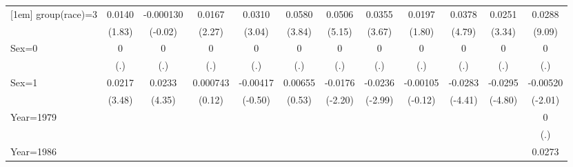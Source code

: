 \begin{table}[htbp]
\begin{tabular}{l*{11}{c}}
[1em]
group(race)=3       &      0.0140         &   -0.000130         &      0.0167\sym{*}  &      0.0310\sym{**} &      0.0580\sym{***}&      0.0506\sym{***}&      0.0355\sym{***}&      0.0197         &      0.0378\sym{***}&      0.0251\sym{**} &      0.0288\sym{***}\\
                    &      (1.83)         &     (-0.02)         &      (2.27)         &      (3.04)         &      (3.84)         &      (5.15)         &      (3.67)         &      (1.80)         &      (4.79)         &      (3.34)         &      (9.09)         \\
[1em]
Sex=0               &           0         &           0         &           0         &           0         &           0         &           0         &           0         &           0         &           0         &           0         &           0         \\
                    &         (.)         &         (.)         &         (.)         &         (.)         &         (.)         &         (.)         &         (.)         &         (.)         &         (.)         &         (.)         &         (.)         \\
[1em]
Sex=1               &      0.0217\sym{**} &      0.0233\sym{***}&    0.000743         &    -0.00417         &     0.00655         &     -0.0176\sym{*}  &     -0.0236\sym{**} &    -0.00105         &     -0.0283\sym{***}&     -0.0295\sym{***}&    -0.00520\sym{*}  \\
                    &      (3.48)         &      (4.35)         &      (0.12)         &     (-0.50)         &      (0.53)         &     (-2.20)         &     (-2.99)         &     (-0.12)         &     (-4.41)         &     (-4.80)         &     (-2.01)         \\
[1em]
Year=1979           &                     &                     &                     &                     &                     &                     &                     &                     &                     &                     &           0         \\
                    &                     &                     &                     &                     &                     &                     &                     &                     &                     &                     &         (.)         \\
[1em]
Year=1986           &                     &                     &                     &                     &                     &                     &                     &                     &                     &                     &      0.0273\sym{***}\\

\end{tabular}
\end{table}
